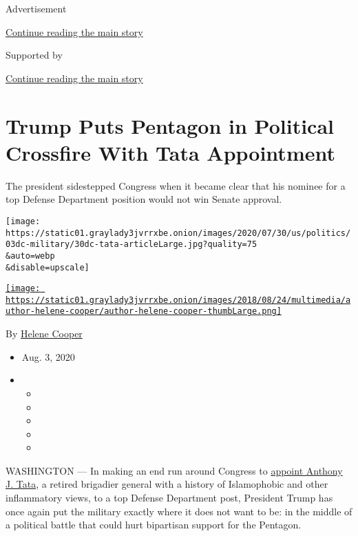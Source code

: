 Advertisement

\protect\hyperlink{after-top}{Continue reading the main story}

Supported by

\protect\hyperlink{after-sponsor}{Continue reading the main story}

\hypertarget{trump-puts-pentagon-in-political-crossfire-with-tata-appointment}{%
\section{Trump Puts Pentagon in Political Crossfire With Tata
Appointment}\label{trump-puts-pentagon-in-political-crossfire-with-tata-appointment}}

The president sidestepped Congress when it became clear that his nominee
for a top Defense Department position would not win Senate approval.

\texttt{[image: https://static01.graylady3jvrrxbe.onion/images/2020/07/30/us/politics/03dc-military/30dc-tata-articleLarge.jpg?quality=75\\\&auto=webp\\\&disable=upscale]}

\href{https://www.nytimes3xbfgragh.onion/by/helene-cooper}{\texttt{[image: https://static01.graylady3jvrrxbe.onion/images/2018/08/24/multimedia/author-helene-cooper/author-helene-cooper-thumbLarge.png]}}

By \href{https://www.nytimes3xbfgragh.onion/by/helene-cooper}{Helene
Cooper}

\begin{itemize}
\item
  Aug. 3, 2020
\item
  \begin{itemize}
  \item
  \item
  \item
  \item
  \item
  \end{itemize}
\end{itemize}

WASHINGTON --- In making an end run around Congress to
\href{https://www.nytimes3xbfgragh.onion/2020/08/02/us/politics/anthony-tata-pentagon-nomination.html}{appoint
Anthony J. Tata}, a retired brigadier general with a history of
Islamophobic and other inflammatory views, to a top Defense Department
post, President Trump has once again put the military exactly where it
does not want to be: in the middle of a political battle that could hurt
bipartisan support for the Pentagon.

